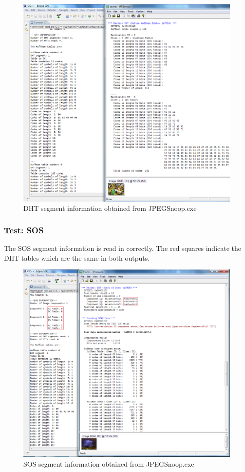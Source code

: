 \newpage

\begin{figure}[!hbtp]
\label{LeavesImage}
\begin{center}
\includegraphics[scale=0.5]{figures/jpegDHTtest1.png} 
\end{center}
\caption{DHT segment information obtained from JPEGSnoop.exe}
\end{figure}

\subsubsection{Test: SOS}

The SOS segment information is read in correctly. The red squares indicate
the DHT tables which are the same in both outputs.

\newpage

\begin{figure}[!hbtp]
\begin{center}
\includegraphics[scale=0.5]{figures/jpegSOStest.png} 
\end{center}
\caption{SOS segment information obtained from JPEGSnoop.exe}
\end{figure}
